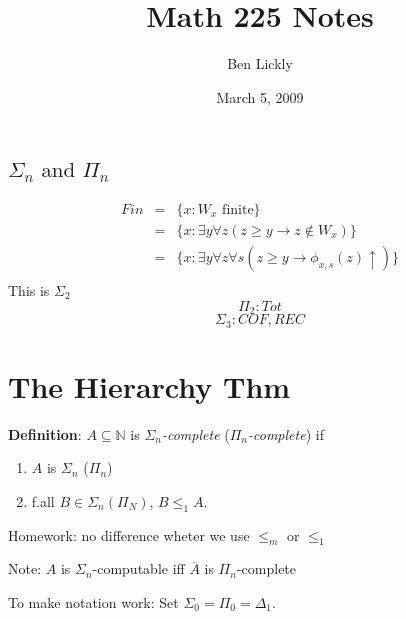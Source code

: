 \documentclass[12pt]{article}
\author{Ben Lickly}
\date{March 5, 2009}
\title{Math 225 Notes}
\newcommand{\Nat}{\ensuremath{\mathbb{N}}}
\newcommand{\Conj}[1]{\ensuremath{\overline{#1}}}
\newcommand{\defn}{\textbf{Definition}: }
\begin{document}
\maketitle

\subsection*{$\Sigma_n \text{ and } \Pi_n$}
\begin{align*}
 Fin &=& \{ x : W_x \text{ finite} \} \\
 &=& \{x : \exists y \forall z (z \ge y \rightarrow z \not\in W_x) \} \\
 &=& \{x : \exists y \forall z \forall s (z \ge y \rightarrow \phi_{x,s}(z) \uparrow) \} \\
\end{align*}
This is $\Sigma_2$
\[
 \Pi_2: Tot
\]
\[
 \Sigma_3: COF, REC
\]

\section*{The Hierarchy Thm}
\defn $A \subseteq \Nat$ is \emph{$\Sigma_n$-complete} (\emph{$\Pi_n$-complete}) if
\begin{enumerate}[(1)]
 \item $A$ is $\Sigma_n$ ($\Pi_n$)
 \item f.all $B \in \Sigma_n (\Pi_N)$, $B \le_1 A$.
\end{enumerate}
Homework: no difference wheter we use $\le_m$ or $\le_1$

Note: $A$ is $\Sigma_n$-computable iff $\Conj{A}$ is $\Pi_n$-complete

To make notation work: Set $\Sigma_0 = \Pi_0 = \Delta_1$.
\end{document}
